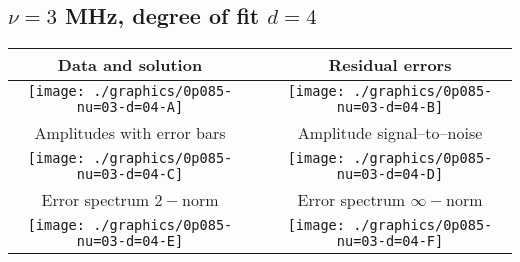 

% 

\clearpage{}
\break{}

\subsection{$\nu = 3$ MHz, degree of fit $d = 4$}

\begin{table}[h]
    \begin{center}
        \begin{tabular}{ccc}
            Data and solution & \quad & Residual errors \\\hline
            \texttt{[image: ./graphics/0p085-nu=03-d=04-A]} &&
            \texttt{[image: ./graphics/0p085-nu=03-d=04-B]} \\[15pt]
            Amplitudes with error bars && Amplitude signal--to--noise \\\hline
            \texttt{[image: ./graphics/0p085-nu=03-d=04-C]} &&
            \texttt{[image: ./graphics/0p085-nu=03-d=04-D]} \\[15pt]
            Error spectrum $2-$norm && Error spectrum $\infty-$norm \\\hline
            \texttt{[image: ./graphics/0p085-nu=03-d=04-E]} &&
            \texttt{[image: ./graphics/0p085-nu=03-d=04-F]} \\[15pt]
        \end{tabular}
    \end{center}
\label{fig:elev=85, nu=3}
\end{table}



\endinput
